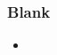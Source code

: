 %
%
%
%


\begin{frame}[fragile]
%
  \frametitle{Blank}
%
  \begin{itemize}
%
  \item 
%
  \end{itemize}
%
\end{frame}

